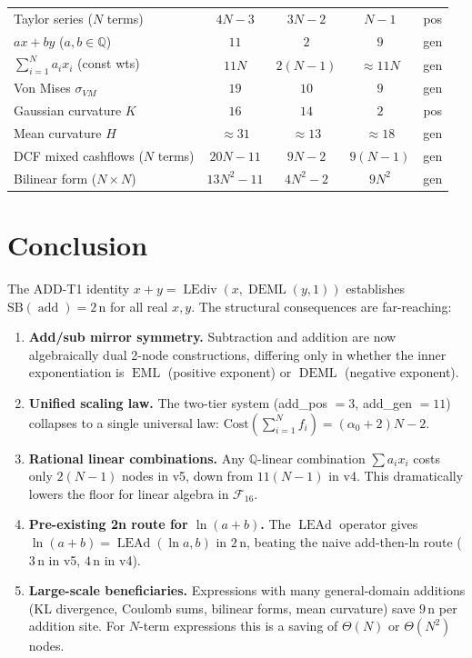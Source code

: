 \documentclass[12pt,a4paper]{article}
\theoremstyle{definition}
\newcommand{\EML}{\operatorname{EML}}
\newcommand{\DEML}{\operatorname{DEML}}
\newcommand{\LEAd}{\operatorname{LEAd}}
\newcommand{\LEdiv}{\operatorname{LEdiv}}
\newcommand{\addop}{\operatorname{add}}
\newcommand{\SB}{\mathrm{SB}}
\newcommand{\Cost}{\mathrm{Cost}}
\newcommand{\F}{\mathcal{F}_{16}}
\begin{document}
\begin{longtable}{@{}lcccc@{}}
Taylor series ($N$ terms)       & $4N{-}3$  & $3N{-}2$  & $N{-}1$   & pos \\
$ax + by$ ($a,b \in \mathbb{Q}$)& $11$      & $2$       & $9$       & gen \\
$\sum_{i=1}^N a_i x_i$ (const wts) & $11N$ & $2(N{-}1)$ & $\approx 11N$ & gen \\
Von Mises $\sigma_{VM}$         & $19$      & $10$      & $9$       & gen \\
Gaussian curvature $K$          & $16$      & $14$      & $2$       & pos \\
Mean curvature $H$              & ${\approx}31$ & ${\approx}13$ & ${\approx}18$ & gen \\
DCF mixed cashflows ($N$ terms) & $20N{-}11$& $9N{-}2$  & $9(N{-}1)$& gen \\
Bilinear form ($N{\times}N$)    & $13N^2{-}11$ & $4N^2{-}2$ & $9N^2$ & gen \\
\end{longtable}

\section{Conclusion}
\label{sec:conclusion}

The ADD-T1 identity $x + y = \LEdiv(x, \DEML(y, 1))$ establishes
$\SB(\addop) = 2\,\text{n}$ for all real $x, y$.  The structural consequences
are far-reaching:

\begin{enumerate}
\item \textbf{Add/sub mirror symmetry.}
  Subtraction and addition are now algebraically dual 2-node constructions,
  differing only in whether the inner exponentiation is $\EML$ (positive
  exponent) or $\DEML$ (negative exponent).

\item \textbf{Unified scaling law.}
  The two-tier system (add\_pos $= 3$, add\_gen $= 11$) collapses to a single
  universal law: $\Cost(\sum_{i=1}^N f_i) = (\alpha_0 + 2)N - 2$.

\item \textbf{Rational linear combinations.}
  Any $\mathbb{Q}$-linear combination $\sum a_i x_i$ costs only $2(N-1)$
  nodes in v5, down from $11(N-1)$ in v4.  This dramatically lowers the
  floor for linear algebra in $\F$.

\item \textbf{Pre-existing 2n route for $\ln(a+b)$.}
  The $\LEAd$ operator gives $\ln(a+b) = \LEAd(\ln a, b)$ in $2\,\text{n}$,
  beating the naive add-then-ln route ($3\,\text{n}$ in v5, $4\,\text{n}$ in v4).

\item \textbf{Large-scale beneficiaries.}
  Expressions with many general-domain additions (KL divergence, Coulomb sums,
  bilinear forms, mean curvature) save $9\,\text{n}$ per addition site.
  For $N$-term expressions this is a saving of $\Theta(N)$ or $\Theta(N^2)$ nodes.
\end{enumerate}
\end{document}
